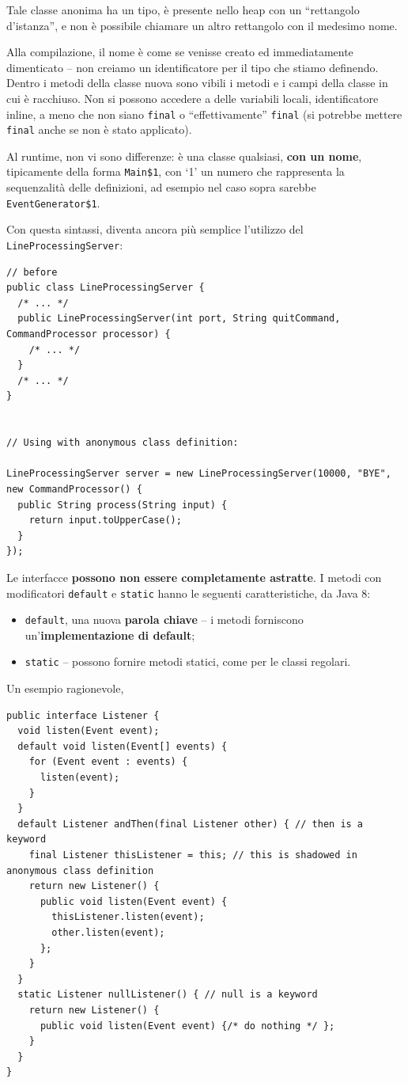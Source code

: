 \documentclass[\fontsizeclass,twocolumn]{\classname}
\theoremstyle{definition}
\theoremstyle{definition}
\begin{document}
Tale classe anonima ha un tipo, è presente nello heap con un ``rettangolo
d'istanza'', e non è possibile chiamare un altro rettangolo con il medesimo
nome.

Alla compilazione, il nome è come se venisse creato ed immediatamente
dimenticato -- non creiamo un identificatore per il tipo che stiamo definendo.
Dentro i metodi della classe nuova sono vibili i metodi e i campi della classe
in cui è racchiuso. Non si possono accedere a delle variabili locali,
identificatore inline, a meno che non siano \texttt{final} o ``effettivamente''
\texttt{final} (si potrebbe mettere \texttt{final} anche se non è stato
applicato).

Al runtime, non vi sono differenze: è una classe qualsiasi, \textbf{con un
nome}, tipicamente della forma \texttt{Main\$1}, con `1' un numero che
rappresenta la sequenzalità delle definizioni, ad esempio nel caso sopra
sarebbe \texttt{Event\-Ge\-ne\-ra\-tor\$1}.

Con questa sintassi, diventa ancora più semplice l'utilizzo del
\texttt{LineProcessing\-Server}:

\begin{lstlisting}
// before
public class LineProcessingServer {
  /* ... */
  public LineProcessingServer(int port, String quitCommand, CommandProcessor processor) {
    /* ... */
  }
  /* ... */
}


// Using with anonymous class definition:

LineProcessingServer server = new LineProcessingServer(10000, "BYE", new CommandProcessor() {
  public String process(String input) {
    return input.toUpperCase();
  }
});
\end{lstlisting}

Le interfacce \textbf{possono non essere completamente astratte}. I metodi con
modificatori \texttt{default} e \texttt{static} hanno le seguenti
caratteristiche, da Java 8:
\begin{itemize}
    \item \texttt{default}, una nuova \textbf{parola chiave} -- i metodi
        forniscono un'\textbf{implementazione di default};
    \item \texttt{static} -- possono fornire metodi statici, come per le classi
        regolari.
\end{itemize}

Un esempio ragionevole,

\begin{lstlisting}
public interface Listener {
  void listen(Event event);
  default void listen(Event[] events) {
    for (Event event : events) {
      listen(event);
    }
  }
  default Listener andThen(final Listener other) { // then is a keyword
    final Listener thisListener = this; // this is shadowed in anonymous class definition
    return new Listener() {
      public void listen(Event event) {
        thisListener.listen(event);
        other.listen(event);
      };
    }
  }
  static Listener nullListener() { // null is a keyword
    return new Listener() {
      public void listen(Event event) {/* do nothing */ };
    }
  }
}
\end{lstlisting}
\end{document}
